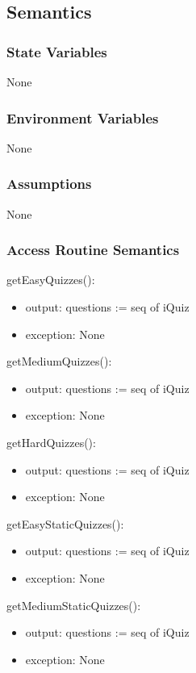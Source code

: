 \documentclass[12pt, titlepage]{article}
\begin{document}
 
\subsection{Semantics}
\subsubsection{State Variables}
None
\subsubsection{Environment Variables}
None
\subsubsection{Assumptions}
None
\subsubsection{Access Routine Semantics}

\noindent getEasyQuizzes():
\begin{itemize}
\item output: questions := seq of iQuiz
\item exception: None
\end{itemize}

\noindent getMediumQuizzes():
\begin{itemize}
\item output: questions := seq of iQuiz
\item exception: None
\end{itemize}

\noindent getHardQuizzes():
\begin{itemize}
\item output: questions := seq of iQuiz
\item exception: None
\end{itemize}

\noindent getEasyStaticQuizzes():
\begin{itemize}
\item output: questions := seq of iQuiz
\item exception: None
\end{itemize}

\noindent getMediumStaticQuizzes():
\begin{itemize}
\item output: questions := seq of iQuiz
\item exception: None
\end{itemize}
\end{document}
